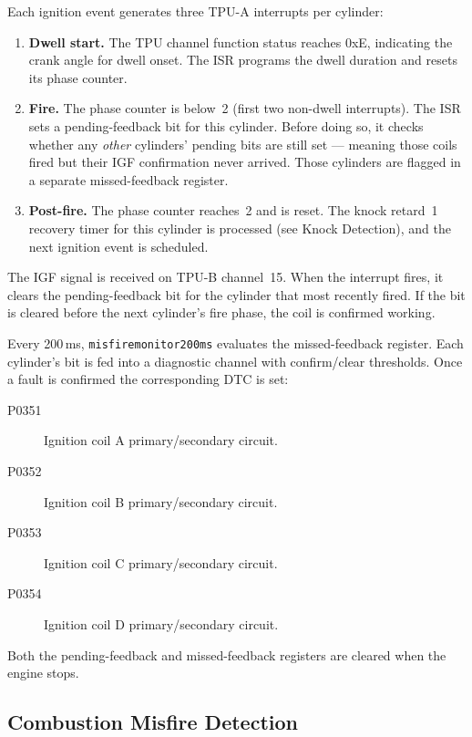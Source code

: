 \documentclass[a4paper,11pt]{article}
\renewcommand{\_}{\oldunderscore\allowbreak}
\begin{document}
Each ignition event generates three TPU-A interrupts per cylinder:

\begin{enumerate}
	\item \textbf{Dwell start.}
	      The TPU channel function status reaches 0xE, indicating the crank
	      angle for dwell onset. The ISR programs the dwell duration and
	      resets its phase counter.

	\item \textbf{Fire.}
	      The phase counter is below~2 (first two non-dwell interrupts).
	      The ISR sets a pending-feedback bit for this cylinder. Before
	      doing so, it checks whether any \emph{other} cylinders' pending
	      bits are still set --- meaning those coils fired but their IGF
	      confirmation never arrived. Those cylinders are flagged in a
	      separate missed-feedback register.

	\item \textbf{Post-fire.}
	      The phase counter reaches~2 and is reset. The knock retard~1
	      recovery timer for this cylinder is processed (see Knock
	      Detection), and the next ignition event is scheduled.
\end{enumerate}

The IGF signal is received on TPU-B channel~15. When the interrupt fires,
it clears the pending-feedback bit for the cylinder that most recently
fired. If the bit is cleared before the next cylinder's fire phase, the
coil is confirmed working.

Every 200\,ms, \texttt{misfire\_monitor\_200ms} evaluates the
missed-feedback register. Each cylinder's bit is fed into a diagnostic
channel with confirm/clear thresholds. Once a fault is confirmed the
corresponding DTC is set:

\begin{description}
	\item[P0351] Ignition coil A primary/secondary circuit.
	\item[P0352] Ignition coil B primary/secondary circuit.
	\item[P0353] Ignition coil C primary/secondary circuit.
	\item[P0354] Ignition coil D primary/secondary circuit.
\end{description}

Both the pending-feedback and missed-feedback registers are cleared when
the engine stops.

\subsection{Combustion Misfire Detection}
\end{document}
